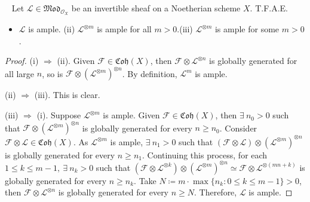 \documentclass[11pt,a4paper,footinclude=true,headinclude=true]{scrbook} %
\newcommand{\FF}{\mathscr{F}}
\newcommand{\LL}{\mathscr{L}}
\newcommand{\OO}{\mathcal{O}}
\newcommand{\<}{\langle}
\newcommand{\>}{\rangle}
\newcommand{\MOD}{\mathfrak{Mod}}
\newcommand{\coh}{\mathfrak{Coh}}
\newenvironment{proposition}[2][]
{\renewcommand\theinnercustomprop{#2}\innercustomprop[#1] 
\begin{mdframed}[backgroundcolor=gray!20]\ }
{\end{mdframed}\endinnercustomprop}
\begin{document}
\begin{proposition}{7.5}
    Let $\LL\in\MOD_{\OO_X}$ be an invertible sheaf on a Noetherian scheme $X$. T.F.A.E.
    \begin{itemize}
        \item[(i)] $\LL$ is ample. \qquad(ii) $\LL^{\otimes m}$ is ample for all $m>0$.\qquad(iii) $\LL^{\otimes m}$ is ample for some $m>0$.
    \end{itemize}
\end{proposition}
\begin{proof}
    (i) $\Rightarrow$ (ii). Given $\FF\in\coh(X)$, then $\FF\otimes\LL^{\otimes n}$ is globally generated for all large $n$, so is $\FF\otimes(\LL^{\otimes m})^{\otimes n}$. By definition, $\LL^m$ is ample.
    
    (ii) $\Rightarrow$ (iii). This is clear.
    
    (iii) $\Rightarrow$ (i). Suppose $\LL^{\otimes m}$ is ample. Given $\FF\in\coh(X)$, then $\exists\ n_0>0$ such that $\FF\otimes(\LL^{\otimes m})^{\otimes n}$ is globally generated for every $n\geq n_0$. Consider $\FF\otimes\LL\in\coh(X)$. As $\LL^{\otimes m}$ is ample, $\exists\ n_1>0$ such that $(\FF\otimes\LL)\otimes(\LL^{\otimes m})^{\otimes n}$ is globally generated for every $n\geq n_1$. Continuing this process, for each $1\leq k\leq m-1,\ \exists\ n_k>0$ such that $(\FF\otimes\LL^{\otimes k})\otimes(\LL^{\otimes m})^{\otimes n}\simeq\FF\otimes\LL^{\otimes(mn+k)}$ is globally generated for every $n\geq n_k$. Take $N\coloneqq m\cdot\max\{n_k:0\leq k\leq m-1\}>0$, then $\FF\otimes\LL^{\otimes n}$ is globally generated for every $n\geq N$. Therefore, $\LL$ is ample.
\end{proof}
\end{document}
